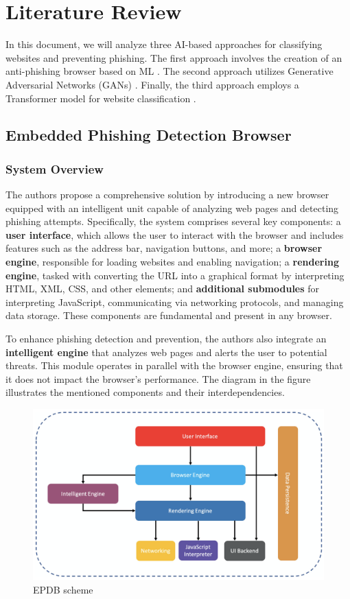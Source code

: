 \chapter{Literature Review}
In this document, we will analyze three AI-based approaches for classifying websites and preventing phishing. The first approach involves the creation of an anti-phishing browser based on ML \textbf{\textcite{EPDB}}. The second approach utilizes Generative Adversarial Networks (GANs) \textbf{\textcite{PDGAN}}. Finally, the third approach employs a Transformer model for website classification \textbf{\textcite{PhishTransformer}}.

\section{Embedded Phishing Detection Browser}

\subsection{System Overview}
The authors propose a comprehensive solution by introducing a new browser equipped with an intelligent unit capable of analyzing web pages and detecting phishing attempts. Specifically, the system comprises several key components: a \textbf{user interface}, which allows the user to interact with the browser and includes features such as the address bar, navigation buttons, and more; a \textbf{browser engine}, responsible for loading websites and enabling navigation; a \textbf{rendering engine}, tasked with converting the URL into a graphical format by interpreting HTML, XML, CSS, and other elements; and \textbf{additional submodules} for interpreting JavaScript, communicating via networking protocols, and managing data storage. These components are fundamental and present in any browser.

To enhance phishing detection and prevention, the authors also integrate an \textbf{intelligent engine} that analyzes web pages and alerts the user to potential threats. This module operates in parallel with the browser engine, ensuring that it does not impact the browser's performance. The diagram in the figure illustrates the mentioned components and their interdependencies.

\begin{figure}[htp]
    \centering
    \includegraphics[width=0.8\linewidth]{images/EPDB_scheme.png}
    \caption{EPDB scheme}
    \label{fig:EPDB scheme}
\end{figure}

